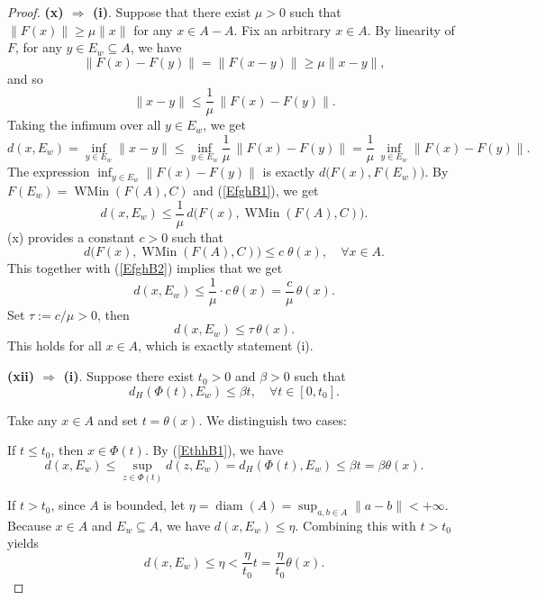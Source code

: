 \documentclass[10pt,a4paper]{amsart}
\begin{document}
\begin{proof}
	
	
	
 

		
		
	\noindent\textbf{(x) $\Rightarrow$ (i)}.  Suppose that   there exist $\mu>0$ such that $\|F(x)\|\ge\mu\|x\|$ for any $x\in A-A$.    Fix an arbitrary $x\in A$.
					 By linearity of $F$, for any $y\in E_w    \subseteq   A$,  we have
			  \[
			 \|F(x)-F(y)\|=\|F(x-y)\|\ge\mu\|x-y\|,
			 \]
 and so 
		\[
		\|x-y\|\le\frac{1}{\mu}\,\|F(x)-F(y)\|.
		\]
		Taking the infimum over all $y\in E_w$, we get
		\begin{equation}\label{EfghB1}
		d(x,E_w)=\inf_{y\in E_w}\|x-y\|
		\le\inf_{y\in E_w}\frac{1}{\mu}\,\|F(x)-F(y)\|
		=\frac{1}{\mu}\,\inf_{y\in E_w}\|F(x)-F(y)\|.
	 \end{equation}
The expression $\inf_{y\in E_w}\|F(x)-F(y)\|$ is exactly $d \bigl(F(x),F(E_w)\bigr)$.  By  $F(E_w)=\operatorname{WMin}(F(A),C)$  and    (\ref{EfghB1}),  we get  
		\begin{equation}\label{EfghB2}
		d(x,E_w)\le\frac{1}{\mu}\,d \bigl(F(x),\operatorname{WMin}(F(A),C)\bigr).  
		 \end{equation}
		  (x) provides a constant $c>0$   such that    
  $$ d \bigl(F(x),\operatorname{WMin}(F(A),C)\bigr)     \le c \; \theta(x),   \quad  \forall x\in A.$$ 
	This together with   (\ref{EfghB2})    implies that  
	  we get
		\[
		d(x,E_w)\le\frac{1}{\mu}\cdot  c  \,\theta(x)=\frac{c}{\mu}\,\theta(x).
		\]
		Set $\tau:=c/\mu>0$,  then
		\[
		d(x,E_w)\le\tau\,\theta(x).
		\]
		This holds for all $x\in A$, which is exactly statement (i).
 
	
		 	\noindent\textbf{(xii) $\Rightarrow$ (i)}.
		Suppose there exist \(t_0 > 0\) and \(\beta > 0\) such that 
		\begin{equation}\label{EthhB1}
			d_H(\Phi(t), E_w) \le \beta t,  \quad  \forall t \in [0, t_0].
		\end{equation}
		
 
	Take any \(x \in A\) and set \(t = \theta(x)\). We distinguish two cases:
	
  If \(t \le t_0\), then \(x \in \Phi(t)\). By   (\ref{EthhB1}),  we have 
		\[
		d(x, E_w) \le \sup_{z \in \Phi(t)} d(z, E_w) = d_H(\Phi(t), E_w) \le \beta t = \beta \theta(x).
		\]
		
		 If \(t > t_0\), since \(A\) is bounded, let \(\eta = \operatorname{diam}(A) = \sup_{a,b \in A} \|a - b\| < +\infty\). Because \(x \in A\) and \(E_w \subseteq A\), we have \(d(x, E_w) \le \eta\). Combining this with \(t > t_0\) yields
		\[
		d(x, E_w) \le \eta < \frac{\eta}{t_0} t = \frac{\eta}{t_0} \theta(x).
		\]
 

\end{proof}
\end{document}
